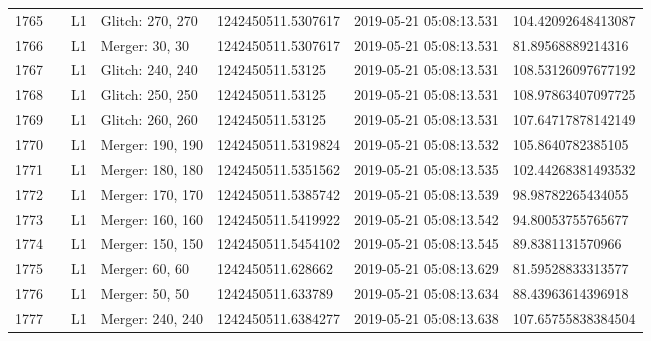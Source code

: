 \begin{longtable}{lllllll}
1765 &                                                    &       L1 &  Glitch: 270, 270 &  1242450511.5307617 &  2019-05-21 05:08:13.531 &  104.42092648413087 \\
1766 &                                                    &       L1 &    Merger: 30, 30 &  1242450511.5307617 &  2019-05-21 05:08:13.531 &   81.89568889214316 \\
1767 &                                                    &       L1 &  Glitch: 240, 240 &    1242450511.53125 &  2019-05-21 05:08:13.531 &  108.53126097677192 \\
1768 &                                                    &       L1 &  Glitch: 250, 250 &    1242450511.53125 &  2019-05-21 05:08:13.531 &  108.97863407097725 \\
1769 &                                                    &       L1 &  Glitch: 260, 260 &    1242450511.53125 &  2019-05-21 05:08:13.531 &  107.64717878142149 \\
1770 &                                                    &       L1 &  Merger: 190, 190 &  1242450511.5319824 &  2019-05-21 05:08:13.532 &   105.8640782385105 \\
1771 &                                                    &       L1 &  Merger: 180, 180 &  1242450511.5351562 &  2019-05-21 05:08:13.535 &  102.44268381493532 \\
1772 &                                                    &       L1 &  Merger: 170, 170 &  1242450511.5385742 &  2019-05-21 05:08:13.539 &   98.98782265434055 \\
1773 &                                                    &       L1 &  Merger: 160, 160 &  1242450511.5419922 &  2019-05-21 05:08:13.542 &   94.80053755765677 \\
1774 &                                                    &       L1 &  Merger: 150, 150 &  1242450511.5454102 &  2019-05-21 05:08:13.545 &    89.8381131570966 \\
1775 &                                                    &       L1 &    Merger: 60, 60 &   1242450511.628662 &  2019-05-21 05:08:13.629 &   81.59528833313577 \\
1776 &                                                    &       L1 &    Merger: 50, 50 &   1242450511.633789 &  2019-05-21 05:08:13.634 &   88.43963614396918 \\
1777 &                                                    &       L1 &  Merger: 240, 240 &  1242450511.6384277 &  2019-05-21 05:08:13.638 &  107.65755838384504 \\

\end{longtable}
